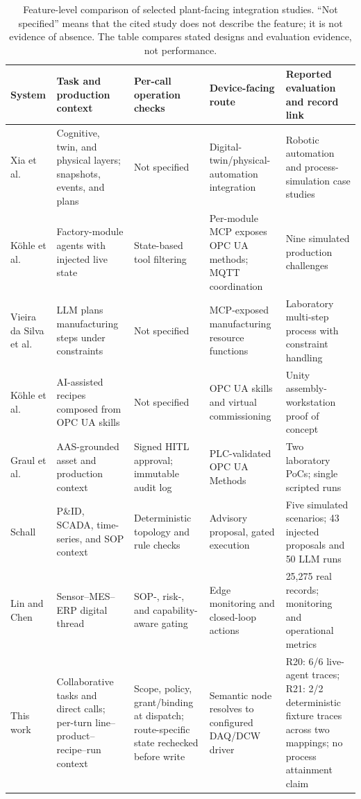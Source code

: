 \begin{table}[!t]
\centering
\caption{Feature-level comparison of selected plant-facing integration
studies. ``Not specified'' means that the cited study does not describe the
feature; it is not evidence of absence. The table compares stated designs and
evaluation evidence, not performance.}
\label{tab:nearest}
\small
\setlength{\tabcolsep}{3pt}
\begin{tabularx}{\textwidth}{@{}p{1.8cm}p{3.0cm}p{2.4cm}p{2.8cm}X@{}}
\toprule
System & Task and production context & Per-call operation checks & Device-facing route & Reported evaluation and record link \\
\midrule
Xia et al. \cite{xia2025architecture} & Cognitive, twin, and physical layers; snapshots, events, and plans & Not specified & Digital-twin/physical-automation integration & Robotic automation and process-simulation case studies \\
K{\"o}hle et al. \cite{koehle2026llmdriven} & Factory-module agents with injected live state & State-based tool filtering & Per-module MCP exposes OPC UA methods; MQTT coordination & Nine simulated production challenges \\
Vieira da Silva et al. \cite{silva2025mcpmanufacturing} & LLM plans manufacturing steps under constraints & Not specified & MCP-exposed manufacturing resource functions & Laboratory multi-step process with constraint handling \\
K{\"o}hle et al. \cite{koehle2025semanticrecipes} & AI-assisted recipes composed from OPC UA skills & Not specified & OPC UA skills and virtual commissioning & Unity assembly-workstation proof of concept \\
Graul et al. \cite{graul2026aas} & AAS-grounded asset and production context & Signed HITL approval; immutable audit log & PLC-validated OPC UA Methods & Two laboratory PoCs; single scripted runs \\
Schall \cite{schall2026safe} & P\&ID, SCADA, time-series, and SOP context & Deterministic topology and rule checks & Advisory proposal, gated execution & Five simulated scenarios; 43 injected proposals and 50 LLM runs \\
Lin and Chen \cite{lin2026agentic} & Sensor--MES--ERP digital thread & SOP-, risk-, and capability-aware gating & Edge monitoring and closed-loop actions & 25,275 real records; monitoring and operational metrics \\
\midrule
This work & Collaborative tasks and direct calls; per-turn line--product--recipe--run context & Scope, policy, grant/binding at dispatch; route-specific state rechecked before write & Semantic node resolves to configured DAQ/DCW driver & R20: 6/6 live-agent traces; R21: 2/2 deterministic fixture traces across two mappings; no process attainment claim \\
\bottomrule
\end{tabularx}
\end{table}

